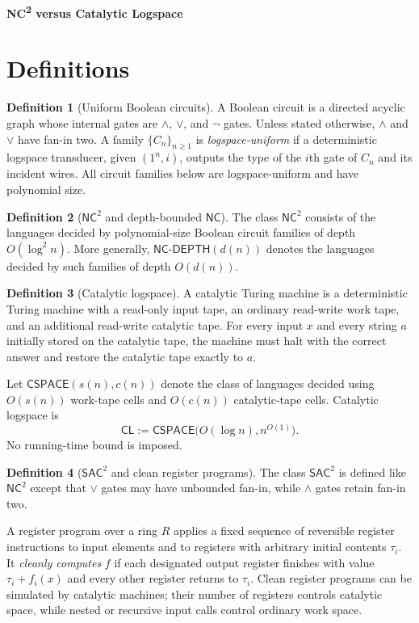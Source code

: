 \documentclass[10pt,a4paper]{article}
\theoremstyle{definition}
\newtheorem*{definition*}{Definition}
\newcommand{\CL}{\mathsf{CL}}
\newcommand{\NC}{\mathsf{NC}}
\newcommand{\SAC}{\mathsf{SAC}}
\newcommand{\CSPACE}{\mathsf{CSPACE}}
\begin{document}
\begin{center}
  {\Large\bfseries NC\textsuperscript{2} versus Catalytic Logspace}
\end{center}

\section{Definitions}

\begin{definition*}[Uniform Boolean circuits]
A Boolean circuit is a directed acyclic graph whose internal gates are
$\wedge$, $\vee$, and $\neg$ gates. Unless stated otherwise, $\wedge$ and
$\vee$ have fan-in two. A family $\{C_n\}_{n\geq1}$ is
\emph{logspace-uniform} if a deterministic logspace transducer, given
$(1^n,i)$, outputs the type of the $i$th gate of $C_n$ and its incident wires.
All circuit families below are logspace-uniform and have polynomial size.
\end{definition*}

\begin{definition*}[$\NC^2$ and depth-bounded $\NC$]
The class $\NC^2$ consists of the languages decided by polynomial-size
Boolean circuit families of depth $O(\log^2n)$. More generally,
$\mathsf{NC\mbox{-}DEPTH}(d(n))$ denotes the languages decided by such
families of depth $O(d(n))$.
\end{definition*}

\begin{definition*}[Catalytic logspace]
A catalytic Turing machine is a deterministic Turing machine with a read-only
input tape, an ordinary read-write work tape, and an additional read-write
catalytic tape. For every input $x$ and every string $a$ initially stored on
the catalytic tape, the machine must halt with the correct answer and restore
the catalytic tape exactly to $a$.

Let $\CSPACE(s(n),c(n))$ denote the class of languages decided using
$O(s(n))$ work-tape cells and $O(c(n))$ catalytic-tape cells. Catalytic
logspace is
\begin{equation}
  \CL:=\CSPACE\bigl(O(\log n),n^{O(1)}\bigr).
\end{equation}
No running-time bound is imposed.
\end{definition*}

\begin{definition*}[$\SAC^2$ and clean register programs]
The class $\SAC^2$ is defined like $\NC^2$ except that $\vee$ gates may have
unbounded fan-in, while $\wedge$ gates retain fan-in two.

A register program over a ring $R$ applies a fixed sequence of reversible
register instructions to input elements and to registers with arbitrary
initial contents $\tau_i$. It \emph{cleanly computes} $f$ if each designated
output register finishes with value $\tau_i+f_i(x)$ and every other register
returns to $\tau_i$. Clean register programs can be simulated by catalytic
machines; their number of registers controls catalytic space, while nested or
recursive input calls control ordinary work space.
\end{definition*}
\end{document}

